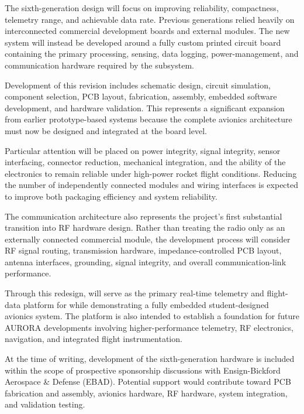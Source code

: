 The sixth-generation design will focus on improving reliability, compactness, telemetry range, and achievable data rate. Previous generations relied heavily on interconnected commercial development boards and external modules. The new system will instead be developed around a fully custom printed circuit board containing the primary processing, sensing, data logging, power-management, and communication hardware required by the subsystem.

Development of this revision includes schematic design, circuit simulation, component selection, PCB layout, fabrication, assembly, embedded software development, and hardware validation. This represents a significant expansion from earlier prototype-based systems because the complete avionics architecture must now be designed and integrated at the board level.

Particular attention will be placed on power integrity, signal integrity, sensor interfacing, connector reduction, mechanical integration, and the ability of the electronics to remain reliable under high-power rocket flight conditions. Reducing the number of independently connected modules and wiring interfaces is expected to improve both packaging efficiency and system reliability.

The communication architecture also represents the project's first substantial transition into RF hardware design. Rather than treating the radio only as an externally connected commercial module, the development process will consider RF signal routing, transmission hardware, impedance-controlled PCB layout, antenna interfaces, grounding, signal integrity, and overall communication-link performance.

Through this redesign, \deimos{} will serve as the primary real-time telemetry and flight-data platform for \ares{} while demonstrating a fully embedded student-designed avionics system. The platform is also intended to establish a foundation for future AURORA developments involving higher-performance telemetry, RF electronics, navigation, and integrated flight instrumentation.

At the time of writing, development of the sixth-generation \deimos{} hardware is included within the scope of prospective sponsorship discussions with Ensign-Bickford Aerospace \& Defense (EBAD). Potential support would contribute toward PCB fabrication and assembly, avionics hardware, RF hardware, system integration, and validation testing.


